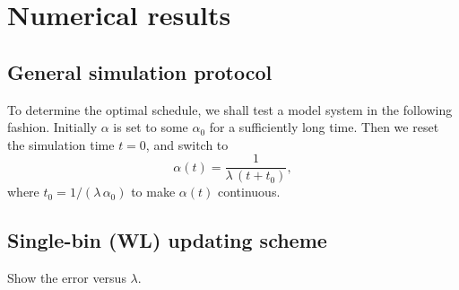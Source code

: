 \documentclass[reprint]{revtex4-1}
\begin{document}




\section{\label{sec:results}
Numerical results}


\subsection{General simulation protocol}


To determine the optimal schedule,
we shall test a model system
in the following fashion.
%
Initially $\alpha$ is set to some $\alpha_0$
for a sufficiently long time.
%
Then we reset the simulation time $t = 0$,
and switch to
$$
\alpha(t) = \frac{ 1 } { \lambda \, (t + t_0) },
$$
where $t_0 = 1/(\lambda \, \alpha_0)$
to make $\alpha(t)$ continuous.


\subsection{Single-bin (WL) updating scheme}

Show the error versus $\lambda$.
\end{document}
